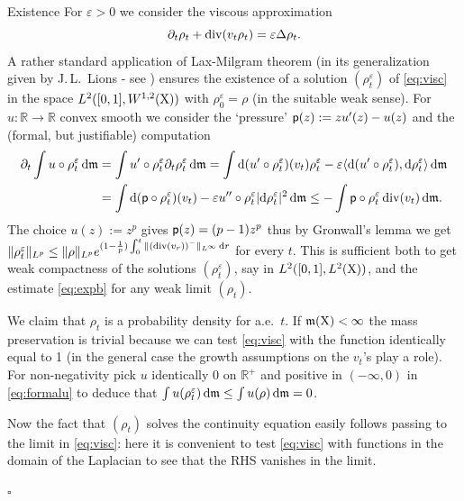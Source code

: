 \documentclass[11pt]{article}
\numberwithin{equation}{section}
\newenvironment{idea}{\removelastskip\par\medskip   %
\noindent{\em Idea of the proof} \rm}{\penalty-20\null\hfill$\square$\par\medbreak}
\newcommand{\R}{\mathbb{R}}
\newcommand{\X}{{\rm X}}
\newcommand{\mm}{{\mathfrak m}}
\renewcommand{\d}{{\rm d}}
\renewcommand{\div}{{\rm div}}
\newcommand{\eps}{\varepsilon}
\newcommand\la{\langle}
\newcommand\ra{\rangle}
\begin{document}
\begin{idea}\ \\
{\sc Existence} For $\eps>0$ we consider the viscous approximation 
\begin{equation}
\label{eq:visc}
\partial_t\rho_t+\div(v_t\rho_t)=\eps\Delta\rho_t.
\end{equation}
A rather standard  application of Lax-Milgram theorem (in its generalization given by J.\,L.\, Lions -  see \cite[Theorem III.2.1, Corollary III.2.3]{Show97}) ensures the existence of a solution $(\rho^\eps_t)$ of \eqref{eq:visc}  in the space $L^2([0,1],W^{1,2}(\X))$ with $\rho^\eps_0=\rho$ (in the suitable weak sense). For $u:\R\to\R$ convex smooth we consider the `pressure' ${\sf p}(z):=zu'(z)-u(z)$ and   the (formal, but justifiable) computation
\begin{equation}
\label{eq:formalu}
\begin{split}
\partial_t\int u\circ\rho_t^\eps\,\d\mm&=\int u'\circ\rho^\eps_t\partial_t\rho^\eps_t\,\d\mm=\int\d(u'\circ\rho^\eps_t)(v_t)\rho^\eps_t-\eps \la\d(u'\circ\rho^\eps_t),\d\rho^\eps_t\ra\,\d\mm\\
&=\int \d({\sf p}\circ\rho^\eps_t)(v_t)-\eps u''\circ\rho^\eps_t|\d\rho^\eps_t|^2\,\d\mm\leq -\int {\sf p}\circ\rho^\eps_t\,\div(v_t)\,\d\mm.
\end{split}
\end{equation}
The choice $u(z):=z^p$ gives ${\sf p}(z)=(p-1)z^p$ thus by Gronwall's lemma we get $\|\rho^\eps_t\|_{L^p}\leq \|\rho\|_{L^p}e^{(1-\frac1p)\int_0^t\|(\div(v_r))^-\|_{L^\infty}\,\d r}$ for every $t$.  This is sufficient both to get weak compactness of the solutions $(\rho^\eps_t)$, say in $L^2([0,1],L^2(\X))$, and the estimate \eqref{eq:expb} for any weak limit $(\rho_t)$. 

We claim that $\rho_t$ is a probability density for a.e.\ $t$. If $\mm(\X)<\infty$ the mass preservation is trivial because we can  test \eqref{eq:visc} with the function identically equal to 1 (in the general case the growth assumptions on the $v_t$'s play a role). For non-negativity  pick $u$ identically 0 on $\R^+$ and positive in $(-\infty,0)$ in \eqref{eq:formalu}  to deduce that $\int u(\rho^\eps_t)\,\d\mm\leq \int u(\rho)\,\d\mm=0$.




Now the fact that   $(\rho_t)$ solves the continuity equation easily follows passing to the limit in \eqref{eq:visc}: here it is convenient to test \eqref{eq:visc} with functions in the domain of the Laplacian to see that the RHS vanishes in the limit.





\end{idea}
\end{document}
